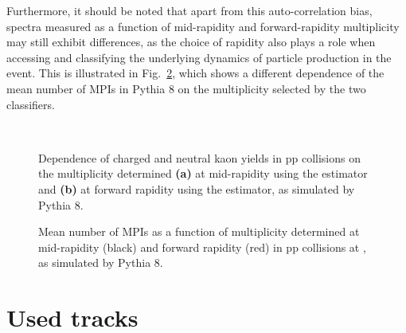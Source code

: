 Furthermore, it should be noted that apart from this auto-correlation bias, spectra measured as a function of mid-rapidity and forward-rapidity multiplicity may still exhibit differences, as the choice of rapidity also plays a role when accessing and classifying the underlying dynamics of particle production in the event. This is illustrated in Fig.~\ref{fig:tracks:nmpi}, which shows a different dependence of the mean number of MPIs \meannmpi in Pythia 8 on the multiplicity selected by the two classifiers.

\begin{figure}[!h]
\hspace{1em}
\\
\caption{Dependence of charged and neutral kaon yields in pp collisions on the multiplicity determined \textbf{(a)} at mid-rapidity using the \NSPD estimator and \textbf{(b)} at forward rapidity using the \VOM estimator, as simulated by Pythia 8. \cite{alicecollaborationMultiplicityDependenceLightflavor2019}}
\label{fig:tracks:ktok}
\end{figure}

\begin{figure}[!h]
\caption{Mean number of MPIs as a function of multiplicity determined at mid-rapidity (black) and forward rapidity (red) in pp collisions at , as simulated by Pythia 8. \cite{alicecollaborationALICEExperimentJourney2022}}
\label{fig:tracks:nmpi}
\end{figure}

\section{Used tracks}

